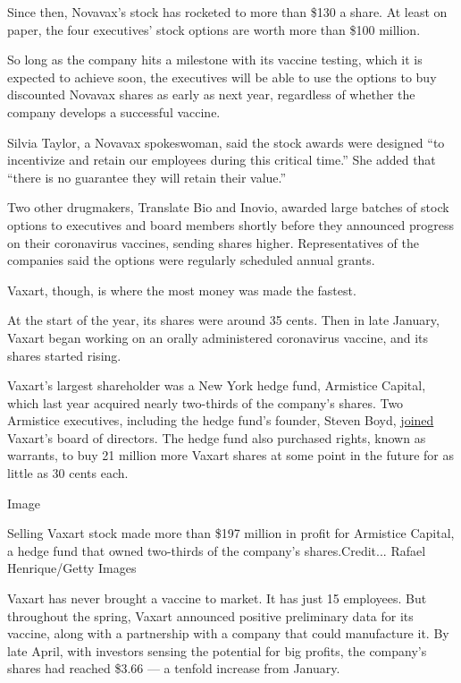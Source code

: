 Since then, Novavax's stock has rocketed to more than \$130 a share. At
least on paper, the four executives' stock options are worth more than
\$100 million.

So long as the company hits a milestone with its vaccine testing, which
it is expected to achieve soon, the executives will be able to use the
options to buy discounted Novavax shares as early as next year,
regardless of whether the company develops a successful vaccine.

Silvia Taylor, a Novavax spokeswoman, said the stock awards were
designed ``to incentivize and retain our employees during this critical
time.'' She added that ``there is no guarantee they will retain their
value.''

Two other drugmakers, Translate Bio and Inovio, awarded large batches of
stock options to executives and board members shortly before they
announced progress on their coronavirus vaccines, sending shares higher.
Representatives of the companies said the options were regularly
scheduled annual grants.

Vaxart, though, is where the most money was made the fastest.

At the start of the year, its shares were around 35 cents. Then in late
January, Vaxart began working on an orally administered coronavirus
vaccine, and its shares started rising.

Vaxart's largest shareholder was a New York hedge fund, Armistice
Capital, which last year acquired nearly two-thirds of the company's
shares. Two Armistice executives, including the hedge fund's founder,
Steven Boyd,
\href{https://investors.vaxart.com/news-releases/news-release-details/vaxart-inc-announces-changes-its-board-directors}{joined}
Vaxart's board of directors. The hedge fund also purchased rights, known
as warrants, to buy 21 million more Vaxart shares at some point in the
future for as little as 30 cents each.

Image

Selling Vaxart stock made more than \$197 million in profit for
Armistice Capital, a hedge fund that owned two-thirds of the company's
shares.Credit... Rafael Henrique/Getty Images

Vaxart has never brought a vaccine to market. It has just 15 employees.
But throughout the spring, Vaxart announced positive preliminary data
for its vaccine, along with a partnership with a company that could
manufacture it. By late April, with investors sensing the potential for
big profits, the company's shares had reached \$3.66 --- a tenfold
increase from January.

